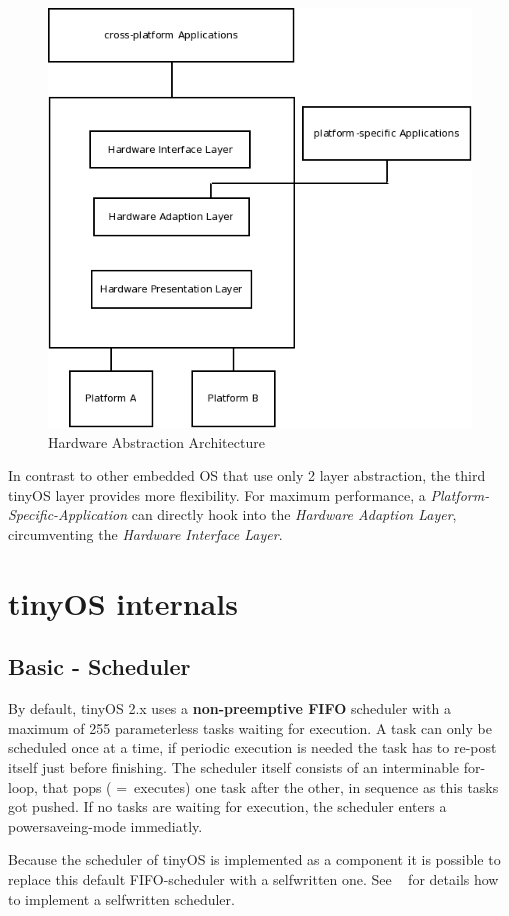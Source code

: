 \begin{figure}[h]
 \centerline{\includegraphics[width=.6\columnwidth]{pics/hardwareabstraction.png}}
  \caption{Hardware Abstraction Architecture}
  \label{fig:haa}
\end{figure}

In contrast to other embedded OS that use only 2 layer abstraction, the third tinyOS layer provides more flexibility. For maximum performance, a \textit{Platform-Specific-Application} can directly hook into the \textit{Hardware Adaption Layer}, circumventing the \textit{Hardware Interface Layer}.


\section{tinyOS internals}

\subsection{Basic - Scheduler}

By default, tinyOS 2.x uses a \textbf{non-preemptive FIFO} scheduler with a maximum of 255 parameterless tasks waiting for execution. A task can only be scheduled once at a time, if periodic execution is needed the task has to re-post itself just before finishing. The scheduler itself consists of an interminable for-loop, that pops ( = executes) one task after the other, in sequence as this tasks got pushed. If no tasks are waiting for execution, the scheduler enters a powersaveing-mode immediatly.

Because the scheduler of tinyOS is implemented as a component it is possible to replace this default FIFO-scheduler with a selfwritten one. See ~\cite{tep106:2003} for details how to implement a selfwritten scheduler.

